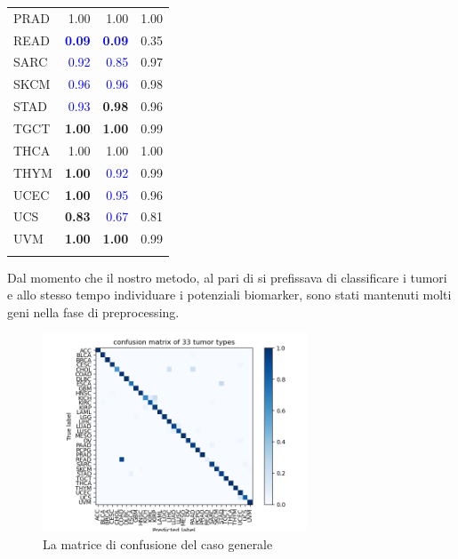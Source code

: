 \begin{table}[h!]
{\begin{tabular}{lrrr}
     PRAD &  1.00 & 1.00 & 1.00 \\
     READ &  \textcolor{blue}{\textbf{0.09}} & \textcolor{blue}{\textbf{0.09}} & 0.35 \\ 
     SARC &  \textcolor{blue}{0.92} & \textcolor{blue}{0.85} & 0.97 \\ 
     SKCM &  \textcolor{blue}{0.96} & \textcolor{blue}{0.96} & 0.98 \\ 
     STAD &  \textcolor{blue}{0.93} & \textbf{0.98} & 0.96 \\ 
     TGCT &  \textbf{1.00} & \textbf{1.00} & 0.99 \\ 
     THCA &  1.00 & 1.00 & 1.00 \\ 
     THYM &  \textbf{1.00} & \textcolor{blue}{0.92} & 0.99 \\ 
     UCEC &  \textbf{1.00} & \textcolor{blue}{0.95} & 0.96 \\ 
     UCS  &  \textbf{0.83} & \textcolor{blue}{0.67} & 0.81 \\ 
     UVM  &  \textbf{1.00} & \textbf{1.00} & 0.99 \\ 
    \bottomrule
    \label{tab:GPU-res}
    \end{tabular} 
    } %
\end{table}
Dal momento che il nostro metodo, al pari di \cite{lyu2018deep} si prefissava di classificare i tumori
e allo stesso tempo individuare i potenziali biomarker, sono stati mantenuti molti geni nella fase
di preprocessing.

\begin{figure}[htbp!]
    \centering
    \includegraphics[width=0.7\textwidth]{images/cnfMatrices/cnf_matrix.png}
    \caption{La matrice di confusione del caso generale}
    \label{fig:cnf_matrix_general}
\end{figure}

